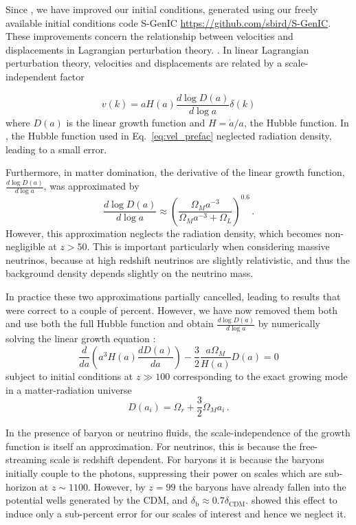 \documentclass[useAMS, usenatbib]{mnras}
\begin{document}

Since \cite{AHB}, we have improved our initial conditions, generated
using our freely available initial conditions code
S-GenIC \url{https://github.com/sbird/S-GenIC}. These improvements concern
the relationship between velocities and displacements in Lagrangian perturbation theory.
\citep{Zeldovich_1970, Scoccimarro_1998}. In linear Lagrangian perturbation theory,
velocities and displacements are related by a scale-independent factor

\begin{equation}
v(k) = a H(a) \frac{d \log D(a)}{d \log a} \delta(k)
\label{eq:vel_prefac}
\end{equation}
where $D(a)$ is the linear growth function and $H = \dot{a}/a$, the Hubble function.
In \cite{AHB}, the Hubble function used in Eq.~\ref{eq:vel_prefac}
neglected radiation density, leading to a small error.

Furthermore, in matter domination, the derivative of the linear growth function,
$\frac{d \log D(a)}{d \log a}$, was approximated by \citep{Bouchet:1995}
\begin{equation}
\frac{d \log D(a)}{d \log a} \approx \left(\frac{\Omega_M a^{-3}}{\Omega_M  a^{-3} + \Omega_L}\right)^{0.6}\,.
\end{equation}
However, this approximation neglects the radiation density, which becomes
non-negligible at $z > 50$. This is important particularly when considering
massive neutrinos, because at high redshift neutrinos are slightly relativistic,
and thus the background density depends slightly on the neutrino mass.

In practice these two approximations partially cancelled, leading
to results that were correct to a couple of percent. However, we
have now removed them both and use both the full Hubble function
and obtain $\frac{d \log D(a)}{d \log a}$ by numerically solving
the linear growth equation \citep{Peebles:1993}:
\begin{equation}
\frac{d}{da}\left(a^3 H(a) \frac{d D(a)}{da}\right) - \frac{3}{2} \frac{a \Omega_M}{H(a)} D(a) = 0
\end{equation}
subject to initial conditions at $z \gg 100$ corresponding
to the exact growing mode in a matter-radiation universe \citep{Groth:1975}
\begin{equation}
  D(a_i) = \Omega_r + \frac{3}{2} \Omega_M a_i\,.
\end{equation}

In the presence of baryon or neutrino fluids, the scale-independence
of the growth function is itself an approximation. For neutrinos, this
is because the free-streaming scale is redshift dependent. For baryons
it is because the baryons initially couple to the photons, suppressing
their power on scales which are sub-horizon at $z \sim 1100$. However,
by $z=99$ the baryons have already fallen into
the potential wells generated by the CDM,
and $\delta_\mathrm{b} \approx 0.7 \delta_\mathrm{CDM}$.
\cite{Zennaro_2017} showed this effect to induce only
a sub-percent error for our scales of interest and hence we neglect it.
\end{document}
